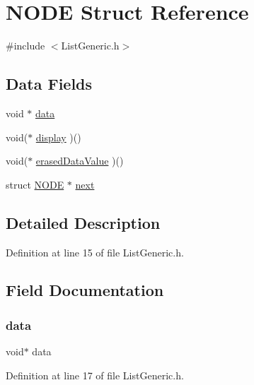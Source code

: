 \hypertarget{struct_n_o_d_e}{}\section{N\+O\+DE Struct Reference}
\label{struct_n_o_d_e}


{\ttfamily \#include $<$List\+Generic.\+h$>$}

\subsection*{Data Fields}
\begin{DoxyCompactItemize}
\item 
void $\ast$ \hyperlink{struct_n_o_d_e_a735984d41155bc1032e09bece8f8d66d}{data}
\item 
void($\ast$ \hyperlink{struct_n_o_d_e_adf2a141d2970ba324b6576930959a524}{display} )()
\item 
void($\ast$ \hyperlink{struct_n_o_d_e_af74860f29ae9aa4b463e2378bcd7a298}{erased\+Data\+Value} )()
\item 
struct \hyperlink{struct_n_o_d_e}{N\+O\+DE} $\ast$ \hyperlink{struct_n_o_d_e_aab1da0ec3c3507ad0a648c72f34b3267}{next}
\end{DoxyCompactItemize}


\subsection{Detailed Description}


Definition at line 15 of file List\+Generic.\+h.



\subsection{Field Documentation}
\mbox{\label{struct_n_o_d_e_a735984d41155bc1032e09bece8f8d66d}} 
\subsubsection{\texorpdfstring{data}{data}}
{\footnotesize\ttfamily void$\ast$ data}



Definition at line 17 of file List\+Generic.\+h.

\mbox{\label{struct_n_o_d_e_adf2a141d2970ba324b6576930959a524}} 
